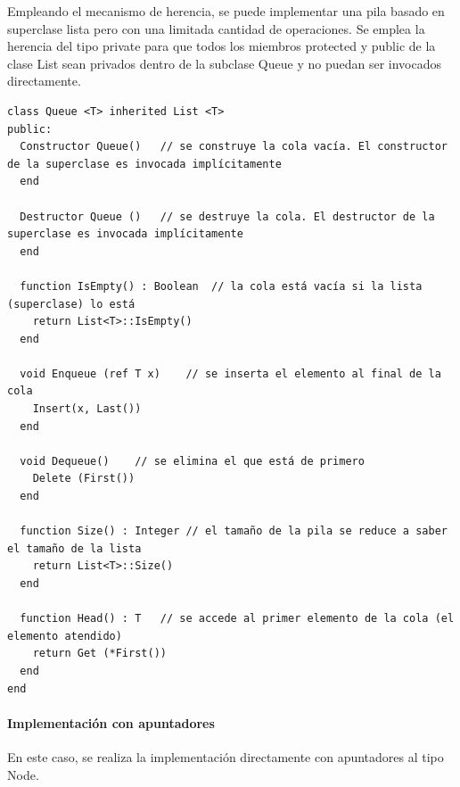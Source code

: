 Empleando el mecanismo de herencia, se puede implementar una pila basado en superclase lista pero con una limitada cantidad de operaciones. Se emplea la herencia del tipo private para que todos los miembros protected y public de la clase List sean privados dentro de la subclase Queue y no puedan ser invocados directamente.

\begin{lstlisting}[upquote=true, language=pseudo]
class Queue <T> inherited List <T>
public:
  Constructor Queue()	// se construye la cola vacía. El constructor de la superclase es invocada implícitamente
  end

  Destructor Queue ()	// se destruye la cola. El destructor de la superclase es invocada implícitamente
  end

  function IsEmpty() : Boolean	// la cola está vacía si la lista (superclase) lo está
    return List<T>::IsEmpty()
  end

  void Enqueue (ref T x)	// se inserta el elemento al final de la cola
    Insert(x, Last())
  end

  void Dequeue()	// se elimina el que está de primero
    Delete (First())
  end

  function Size() : Integer	// el tamaño de la pila se reduce a saber el tamaño de la lista
    return List<T>::Size()
  end

  function Head() : T	// se accede al primer elemento de la cola (el elemento atendido)
    return Get (*First())
  end
end
\end{lstlisting}

\paragraph{Implementación con apuntadores}

En este caso, se realiza la implementación directamente con apuntadores al tipo Node.

